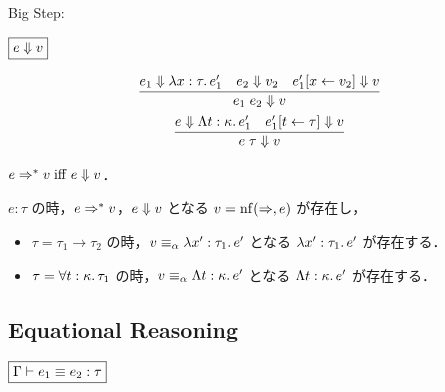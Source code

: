 Big Step:

$\fbox{$e \Downarrow v$}$

\begin{gather*}
  \infer{e_1\; e_2 \bigeval v}{
    e_1 \bigeval \lambda x:\tau\ldotp e'_1
    &
    e_2 \bigeval v_2
    &
    e'_1[x \assign v_2] \bigeval v
  }
  \\
  \infer{e\; \tau \bigeval v}{
    e \bigeval \Lambda t: \kappa\ldotp e'_1
    &
    e'_1[t \assign \tau] \bigeval v
  }
\end{gather*}

\begin{theorem}
  $e \Rightarrow^* v \mathrel{\mathrm{iff}} e \Downarrow v$．
\end{theorem}

\begin{theorem}
  $e: \tau$ の時，$e \Rightarrow^* v$，$e \Downarrow v$ となる $v = \mathop{\mathrm{nf}}(\Rightarrow, e)$ が存在し，
  \begin{itemize}
    \item $\tau = \tau_1 \to \tau_2$ の時，$v \equiv_\alpha \lambda x':\tau_1\ldotp e'$ となる $\lambda x':\tau_1\ldotp e'$ が存在する．
    \item $\tau = \forall t: \kappa\ldotp \tau_1$ の時，$v \equiv_\alpha \Lambda t: \kappa\ldotp e'$ となる $\Lambda t: \kappa\ldotp e'$ が存在する．
  \end{itemize}
\end{theorem}

\subsection{Equational Reasoning}

$\fbox{$\Gamma \vdash e_1 \equiv e_2: \tau$}$

